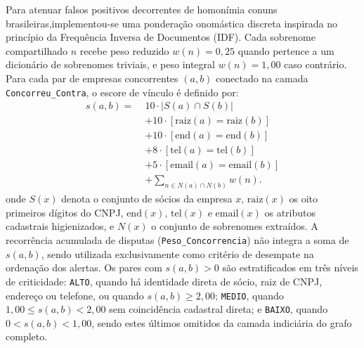 Para atenuar falsos positivos decorrentes de homonímia conuns brasileiras,implementou-se uma ponderação onomástica discreta inspirada no princípio da Frequência Inversa de Documentos (IDF). Cada sobrenome compartilhado $n$ recebe peso reduzido $w(n)=0,25$ quando pertence a um dicionário de sobrenomes triviais, e peso integral $w(n)=1,00$ caso contrário. Para cada par de empresas concorrentes $(a,b)$ conectado na camada \texttt{Concorreu\_Contra}, o escore de vínculo é definido por: \begin{equation} \begin{aligned} s(a,b) =\;& 10 \cdot |S(a)\cap S(b)| \\ & + 10\cdot[\mathrm{raiz}(a)=\mathrm{raiz}(b)] \\ & + 10\cdot[\mathrm{end}(a)=\mathrm{end}(b)] \\ & + 8\cdot[\mathrm{tel}(a)=\mathrm{tel}(b)] \\ & + 5\cdot[\mathrm{email}(a)=\mathrm{email}(b)] \\ & + \sum_{n\in N(a)\cap N(b)} w(n). \end{aligned} \end{equation} onde $S(x)$ denota o conjunto de sócios da empresa $x$, $\mathrm{raiz}(x)$ os oito primeiros dígitos do CNPJ, $\mathrm{end}(x)$, $\mathrm{tel}(x)$ e $\mathrm{email}(x)$ os atributos cadastrais higienizados, e $N(x)$ o conjunto de sobrenomes extraídos. A recorrência acumulada de disputas (\texttt{Peso\_Concorrencia}) não integra a soma de $s(a,b)$, sendo utilizada exclusivamente como critério de desempate na ordenação dos alertas. Os pares com $s(a,b)>0$ são estratificados em três níveis de criticidade: \texttt{ALTO}, quando há identidade direta de sócio, raiz de CNPJ, endereço ou telefone, ou quando $s(a,b)\geq 2,00$; \texttt{MEDIO}, quando $1,00 \leq s(a,b) < 2,00$ sem coincidência cadastral direta; e \texttt{BAIXO}, quando $0 < s(a,b) < 1,00$, sendo estes últimos omitidos da camada indiciária do grafo completo.

